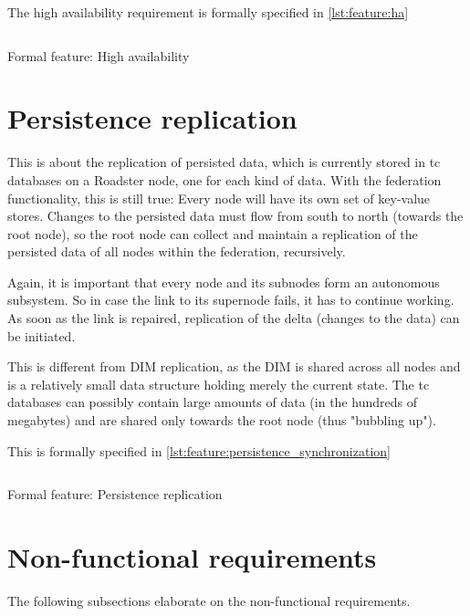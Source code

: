 The high availability requirement is formally specified in \autoref{lst:feature:ha}

\begin{listing}
	\inputminted{Gherkin}{listings/features/high_availability.feature}
	\caption{Formal feature: High availability}
	\label{lst:feature:ha}
\end{listing}

\section{Persistence replication}
This is about the replication of persisted data, which is currently stored
in \gls{tc} databases on a Roadster node, one for each kind of data. With the federation functionality, this is
still true: Every node will have its own set of key-value stores. Changes to the persisted
data must flow from south to north (towards the root node), so the root
node can collect and maintain a replication of the persisted data of all
nodes within the federation, recursively.

Again, it is important that every node and its subnodes form an autonomous subsystem. So
in case the link to its supernode fails, it has to continue working. As soon as
the link is repaired, replication of the delta (changes to the data) can
be initiated.

This is different from \gls{DIM} replication, as the DIM is shared across
all nodes and is a relatively small data structure holding merely the current state. The \gls{tc} databases
can possibly contain large amounts of data (in the hundreds of megabytes) and
are shared only towards the root node (thus "bubbling up").

This is formally specified in \autoref{lst:feature:persistence_synchronization}

\begin{listing}
	\inputminted{Gherkin}{listings/features/persistence_synchronization.feature}
	\caption{Formal feature: Persistence replication}
	\label{lst:feature:persistence_synchronization}
\end{listing}

\section{Non-functional requirements}\label{sec:nfr}
The following subsections elaborate on the non-functional requirements.

